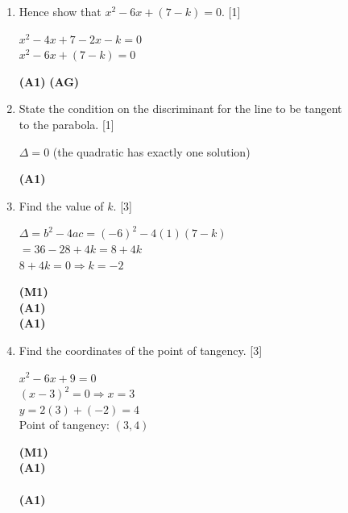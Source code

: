 \documentclass[12pt, twoside]{article}
\begin{document}
\begin{enumerate}[itemsep=0.2cm]
\begin{enumerate}[itemsep=0.3cm]
  \medskip
  \item Hence show that $x^2 - 6x + (7 - k) = 0$. \hfill [1]

  \begin{minipage}[t]{0.62\textwidth}
  $x^2 - 4x + 7 - 2x - k = 0$\\[0.15cm]
  $x^2 - 6x + (7 - k) = 0$
  \end{minipage}%
  \begin{minipage}[t]{0.35\textwidth}\raggedleft
  \textbf{(A1)} \textbf{(AG)}
  \end{minipage}

  \medskip
  \item State the condition on the discriminant for the line to be tangent\\
        to the parabola. \hfill [1]

  \begin{minipage}[t]{0.62\textwidth}
  $\Delta = 0$ \quad (the quadratic has exactly one solution)
  \end{minipage}%
  \begin{minipage}[t]{0.35\textwidth}\raggedleft
  \textbf{(A1)}
  \end{minipage}

  \medskip
  \item Find the value of $k$. \hfill [3]

  \begin{minipage}[t]{0.62\textwidth}
  $\Delta = b^2 - 4ac = (-6)^2 - 4(1)(7 - k)$\\[0.15cm]
  $= 36 - 28 + 4k = 8 + 4k$\\[0.15cm]
  $8 + 4k = 0 \Rightarrow k = -2$
  \end{minipage}%
  \begin{minipage}[t]{0.35\textwidth}\raggedleft
  \textbf{(M1)}\\[0.15cm]
  \textbf{(A1)}\\[0.15cm]
  \textbf{(A1)}
  \end{minipage}

  \medskip
  \item Find the coordinates of the point of tangency. \hfill [3]

  \begin{minipage}[t]{0.62\textwidth}
  $x^2 - 6x + 9 = 0$\\[0.15cm]
  $(x - 3)^2 = 0 \Rightarrow x = 3$\\[0.15cm]
  $y = 2(3) + (-2) = 4$\\[0.15cm]
  Point of tangency: $(3, 4)$
  \end{minipage}%
  \begin{minipage}[t]{0.35\textwidth}\raggedleft
  \textbf{(M1)}\\[0.15cm]
  \textbf{(A1)}\\[0.15cm]
  ~\\[0.15cm]
  \textbf{(A1)}
  \end{minipage}
\end{enumerate}


\end{enumerate}
\end{document}
